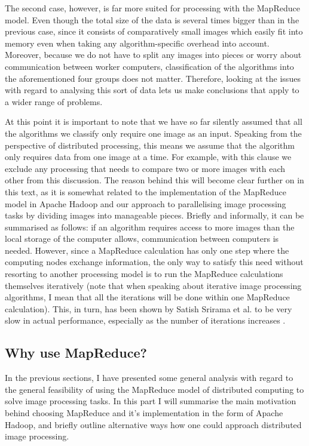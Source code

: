 \documentclass [12pt,a4paper]{report}
\begin{document}
The second case, however, is far more suited for processing with the MapReduce model. Even though the total size of the data is several times bigger than in the previous case, since it consists of comparatively small images which easily fit into memory even when taking any algorithm-specific overhead into account. Moreover, because we do not have to split any images into pieces or worry about communication between worker computers, classification of the algorithms into the aforementioned four groups does not matter. Therefore, looking at the issues with regard to analysing this sort of data lets us make conclusions that apply to a wider range of problems. 

At this point it is important to note that we have so far silently assumed that all the algorithms we classify only require one image as an input. Speaking from the perspective of distributed processing, this means we assume that the algorithm only requires data from one image at a time. For example, with this clause we exclude any processing that needs to compare two or more images with each other from this discussion. The reason behind this will become clear further on in this text, as it is somewhat related to the implementation of the MapReduce model in Apache Hadoop and our approach to parallelising image processing tasks by dividing images into manageable pieces. Briefly and informally, it can be summarised as follows: if an algorithm requires access to more images than the local storage of the computer allows, communication between computers is needed. However, since a MapReduce calculation has only one step where the computing nodes exchange information, the only way to satisfy this need without resorting to another processing model is to run the MapReduce calculations themselves iteratively (note that when speaking about iterative image processing algorithms, I mean that all the iterations will be done within one MapReduce calculation). This, in turn, has been shown by Satish Srirama et al. to be very slow in actual performance, especially as the number of iterations increases \cite{srirama2012adapting}.

\subsection{Why use MapReduce?}

In the previous sections, I have presented some general analysis with regard to the general feasibility of using the MapReduce model of distributed computing to solve image processing tasks. In this part I will summarise the main motivation behind choosing MapReduce and it's implementation in the form of Apache Hadoop, and briefly outline alternative ways how one could approach distributed image processing.
\end{document}
